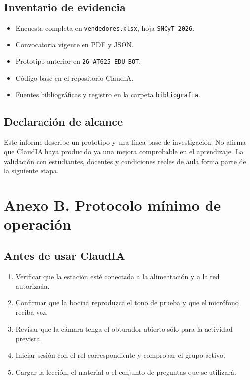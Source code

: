 \documentclass[letterpaper,11pt]{article}
\begin{document}
\vspace{12pt}
\subsection*{Inventario de evidencia}
\begin{itemize}
  \item Encuesta completa en \texttt{vendedores.xlsx}, hoja \texttt{SNCyT\_2026}.
  \item Convocatoria vigente en PDF y JSON.
  \item Prototipo anterior en \texttt{26-AT625 EDU BOT}.
  \item Código base en el repositorio ClaudIA.
  \item Fuentes bibliográficas y registro en la carpeta \texttt{bibliografia}.
\end{itemize}

\vspace{10pt}
\subsection*{Declaración de alcance}
Este informe describe un prototipo y una línea base de investigación. No afirma que ClaudIA haya producido ya una mejora comprobable en el aprendizaje. La validación con estudiantes, docentes y condiciones reales de aula forma parte de la siguiente etapa.

\clearpage

\section*{Anexo B. Protocolo mínimo de operación}

\subsection*{Antes de usar ClaudIA}
\begin{enumerate}
  \item Verificar que la estación esté conectada a la alimentación y a la red autorizada.
  \item Confirmar que la bocina reproduzca el tono de prueba y que el micrófono reciba voz.
  \item Revisar que la cámara tenga el obturador abierto sólo para la actividad prevista.
  \item Iniciar sesión con el rol correspondiente y comprobar el grupo activo.
  \item Cargar la lección, el material o el conjunto de preguntas que se utilizará.
\end{enumerate}
\end{document}
